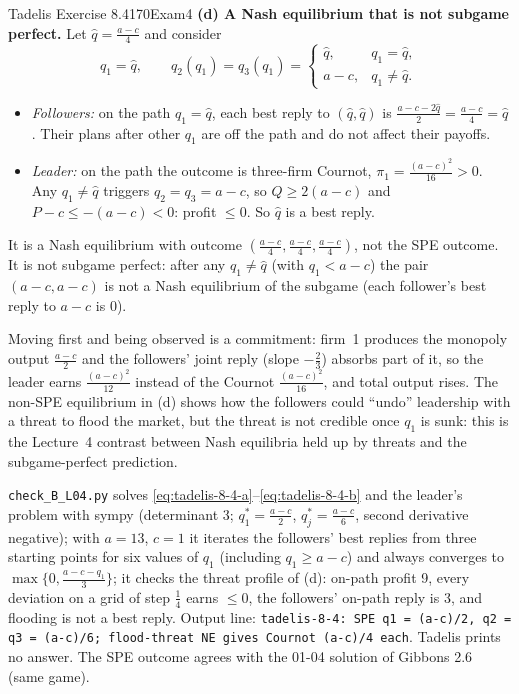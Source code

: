 \begin{exsol}{Tadelis Exercise 8.4}{170}{Exam}{4}
\textbf{(d) A Nash equilibrium that is not subgame perfect.} Let $\hat q = \frac{a-c}{4}$ and consider
\[
  q_1 = \hat q, \qquad
  q_2(q_1) = q_3(q_1) = \begin{cases} \hat q, & q_1 = \hat q,\\ a - c, & q_1 \ne \hat q. \end{cases}
\]
\begin{itemize}
  \item \emph{Followers:} on the path $q_1 = \hat q$, each best reply to $(\hat q, \hat q)$ is
  $\frac{a - c - 2\hat q}{2} = \frac{a-c}{4} = \hat q$. Their plans after other $q_1$ are off the
  path and do not affect their payoffs.
  \item \emph{Leader:} on the path the outcome is three-firm Cournot, $\pi_1 = \frac{(a-c)^2}{16} > 0$.
  Any $q_1 \ne \hat q$ triggers $q_2 = q_3 = a - c$, so $Q \ge 2(a-c)$ and $P - c \le -(a - c) < 0$:
  profit $\le 0$. So $\hat q$ is a best reply.
\end{itemize}
It is a Nash equilibrium with outcome $(\frac{a-c}{4}, \frac{a-c}{4}, \frac{a-c}{4})$, not the SPE
outcome. It is not subgame perfect: after any $q_1 \ne \hat q$ (with $q_1 < a - c$) the pair
$(a-c, a-c)$ is not a Nash equilibrium of the subgame (each follower's best reply to $a-c$ is $0$).

\interp Moving first and being observed is a commitment: firm~1 produces the monopoly output
$\frac{a-c}{2}$ and the followers' joint reply (slope $-\frac23$) absorbs part of it, so the leader earns
$\frac{(a-c)^2}{12}$ instead of the Cournot $\frac{(a-c)^2}{16}$, and total output rises. The non-SPE
equilibrium in (d) shows how the followers could ``undo'' leadership with a threat to flood the market,
but the threat is not credible once $q_1$ is sunk: this is the Lecture~4 contrast between Nash
equilibria held up by threats and the subgame-perfect prediction.

\verify \texttt{check\_B\_L04.py} solves \eqref{eq:tadelis-8-4-a}--\eqref{eq:tadelis-8-4-b} and the
leader's problem with sympy (determinant 3; $q_1^* = \frac{a-c}{2}$, $q_j^* = \frac{a-c}{6}$, second
derivative negative); with $a = 13$, $c = 1$ it iterates the followers' best replies from three starting
points for six values of $q_1$ (including $q_1 \ge a - c$) and always converges to
$\max\{0, \frac{a-c-q_1}{3}\}$; it checks the threat profile of (d): on-path profit 9, every deviation
on a grid of step $\frac14$ earns $\le 0$, the followers' on-path reply is 3, and flooding is not a best
reply. Output line: \texttt{tadelis-8-4: SPE q1 = (a-c)/2, q2 = q3 = (a-c)/6; flood-threat NE gives
Cournot (a-c)/4 each}. Tadelis prints no answer. The SPE outcome agrees with the 01-04 solution of
Gibbons 2.6 (same game).


\end{exsol}
